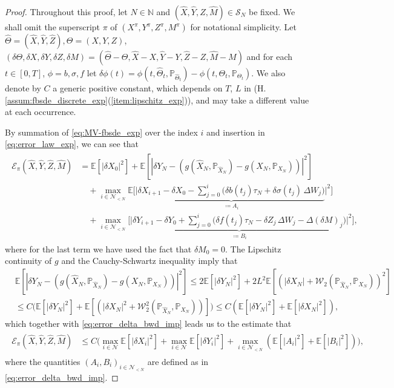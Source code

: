 \documentclass[11pt]{article}
\numberwithin{equation}{section}
\theoremstyle{definition}
\theoremstyle{remark}
\def\l{\label}  \def\f{\frac}  \def\fa{\forall}
\def\cE{\mathcal{E}}
\def\cN{\mathcal{N}}
\def\cS{\mathcal{S}}
\def\cW{\mathcal{W}}
\def\sE{{\mathbb{E}}}
\def\sN{{\mathbb{N}}}
\def\sP{\mathbb{P}}
\begin{document}
\begin{proof}
Throughout this proof, 
let 
 $N\in\sN$ 
 and
 $(\hat{X},\hat{Y},\hat{Z}, \hat{M})\in \cS_N$
 be fixed.
We shall omit the superscript $\pi$ of  $(X^\pi,Y^\pi, Z^\pi, M^\pi)$ 
 for notational simplicity.
Let
$\hat{\Theta}=(\hat{X}, \hat{Y}, \hat{Z}),\Theta=(X, Y, Z)$,
 $(\delta \Theta, \delta X,\delta Y, \delta Z, \delta M)= ( \hat{ \Theta}-\Theta, \hat{X}-X, \hat{Y}-Y, \hat{Z}-Z, \hat{M}-M)$
and for each $t\in [0,T]$, $\phi=b, \sigma, f$
let $\delta \phi(t)= \phi(t, \hat{\Theta}_t,\sP_{\hat{\Theta}_t})-\phi(t, \Theta_t,\sP_{\Theta_t})$.
We also denote by $C$ a generic  positive constant, 
which
depends on $T$,
 $L$  in (H.\ref{assum:fbsde_discrete_exp}(\ref{item:lipschitz_exp})),
and  may take a different value at each occurrence.
 
 
 
 
By  summation of \eqref{eq:MV-fbsde_exp}
over the index $i$
and insertion in \eqref{eq:error_law_exp},
we can see that
\begin{align}\l{eq:error_delta_bwd_imp}
\begin{split}
\cE_\pi(\hat{X},\hat{Y},\hat{Z}, \hat{M})
&=
\sE[|\delta {X}_0|^2]
+
\sE[|\delta {Y}_N-(g(\hat{X}_N,\sP_{\hat{X}_N})-g({X}_N,\sP_{{X}_N}))|^2]
\\
&\quad +
\max_{i\in \cN_{<N}}
\sE
\bigg[
\bigg|
\underbrace{
\delta {X}_{i+1}
-\delta {X}_{0}
-\sum_{j=0}^i
\big(
\delta b(t_{j})\tau_N  +
\delta \sigma (t_j)\, \Delta W_j
\big)
}_{\coloneqq A_{i}}
\bigg|^2
\bigg]\\
&\quad +
\max_{i\in \cN_{<N}}
\bigg[
\bigg|
\underbrace{
\delta {Y}_{i+1}-\delta {Y}_0
+\sum_{j=0}^{i}
\big(
\delta f(t_{j})\tau_N- \delta{Z}_j\,\Delta W_j-\Delta (\delta {M})_j
\big)
}_{\coloneqq B_{i}}
\bigg|^2
\bigg],
\end{split}
\end{align}
where for  the last  term we have used the fact that $\delta M_0=0$.
The Lipschitz continuity of  $g$ and the Cauchy-Schwartz inequality imply  that
\begin{align*}
&\sE[|\delta {Y}_N-(g(\hat{X}_N,\sP_{\hat{X}_N})-g({X}_N,\sP_{{X}_N}))|^2]
\le 
2\sE[|\delta {Y}_N|^2]+2L^2\sE[(|\delta {X}_N|+\cW_2(\sP_{\hat{X}_N},\sP_{{X}_N}))^2]
\\
&\le 
C\big(\sE[|\delta {Y}_N|^2]+\sE[(|\delta {X}_N|^2+\cW^2_2(\sP_{\hat{X}_N},\sP_{{X}_N}))]
\big)
\le
C(\sE[|\delta {Y}_N|^2]+\sE[|\delta {X}_N|^2]),
\end{align*}
which together with \eqref{eq:error_delta_bwd_imp} leads us to the estimate that
\begin{align}\l{eq:efficient_error1_bwd_imp}
\begin{split}
\cE_\pi(\hat{X},\hat{Y},\hat{Z}, \hat{M})
&\le
C\bigg(
\max_{i\in \cN}\sE[|\delta {X}_i|^2]
+\max_{i\in \cN}\sE[|\delta {Y}_i|^2]
 +
\max_{i\in \cN_{<N}}
(\sE[ |A_{i}|^2] +\sE[ |B_{i}|^2])
\bigg),
\end{split}
\end{align}
where the quantities $(A_i,B_i)_{i\in \cN_{<N}}$ are defined as in \eqref{eq:error_delta_bwd_imp}.


\end{proof}
\end{document}
